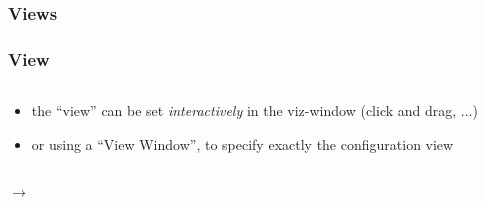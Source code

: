 \subsubsection{Views}
\begin{frame}
\frametitle{View}
\vspace{-2.5mm}
\begin{columns}
\begin{column}{12.5cm}
\begin{itemize}
        \item the ``view'' can be set \textit{interactively} in the viz-window (click and drag, ...)
        \item or using a ``View Window'', to specify exactly the configuration view
\end{itemize}
\end{column}
\end{columns}

        \pause
        \textcolor{DarkBlue}{}
         $\rightarrow$ 


\end{frame}
